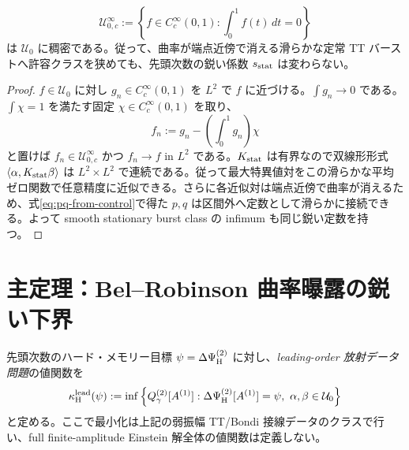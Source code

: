 \begin{lemma}[滑らかな定常バーストでも同じ鋭い定数]
\label{lem:smooth-density}
\[
\mathcal U_{0,c}^\infty:=\left\{f\in C_c^\infty(0,1):\int_0^1f(t)\,dt=0\right\}
\]
は $\mathcal U_0$ に稠密である。従って、曲率が端点近傍で消える滑らかな定常 TT バーストへ許容クラスを狭めても、先頭次数の鋭い係数 $s_{\rm stat}$ は変わらない。
\end{lemma}
\begin{proof}
$f\in\mathcal U_0$ に対し $g_n\in C_c^\infty(0,1)$ を $L^2$ で $f$ に近づける。$\int g_n\to0$ である。$\int\chi=1$ を満たす固定 $\chi\in C_c^\infty(0,1)$ を取り、
\[
f_n:=g_n-\left(\int_0^1g_n\right)\chi
\]
と置けば $f_n\in\mathcal U_{0,c}^\infty$ かつ $f_n\to f$ in $L^2$ である。$K_{\rm stat}$ は有界なので双線形形式 $\langle\alpha,K_{\rm stat}\beta\rangle$ は $L^2\times L^2$ で連続である。従って最大特異値対をこの滑らかな平均ゼロ関数で任意精度に近似できる。さらに各近似対は端点近傍で曲率が消えるため、式\eqref{eq:pq-from-control}で得た $p,q$ は区間外へ定数として滑らかに接続できる。よって smooth stationary burst class の infimum も同じ鋭い定数を持つ。
\end{proof}

\section{主定理：Bel--Robinson 曲率曝露の鋭い下界}
先頭次数のハード・メモリー目標 $\psi=\Delta\Psi_{\rm H}^{(2)}$ に対し、\emph{leading-order 放射データ問題}の値関数を
\begin{equation}
\kappa_{\rm H}^{\rm lead}(\psi):=
\inf\left\{Q_\gamma^{(2)}[A^{(1)}]:\Delta\Psi_{\rm H}^{(2)}[A^{(1)}]=\psi,\ \alpha,\beta\in\mathcal U_0\right\}
\label{eq:kappa-hard-lead}
\end{equation}
と定める。ここで最小化は上記の弱振幅 TT/Bondi 接線データのクラスで行い、full finite-amplitude Einstein 解全体の値関数は定義しない。

